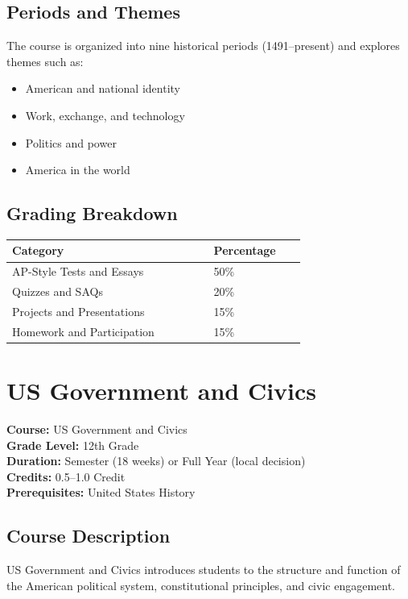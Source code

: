 \documentclass[12pt,oneside]{book}
\begin{document}
\section{Periods and Themes}
The course is organized into nine historical periods (1491--present) and explores themes such as:
\begin{itemize}[leftmargin=2em]
    \item American and national identity
    \item Work, exchange, and technology
    \item Politics and power
    \item America in the world
\end{itemize}

\section{Grading Breakdown}
\begin{center}
\begin{tabular}{L{0.55\linewidth}L{0.25\linewidth}}
\toprule
\textbf{Category} & \textbf{Percentage} \\
\midrule
AP-Style Tests and Essays & 50\% \\
Quizzes and SAQs & 20\% \\
Projects and Presentations & 15\% \\
Homework and Participation & 15\% \\
\bottomrule
\end{tabular}
\end{center}

\chapter{US Government and Civics}

\noindent\textbf{Course:} US Government and Civics\\
\textbf{Grade Level:} 12th Grade\\
\textbf{Duration:} Semester (18 weeks) or Full Year (local decision)\\
\textbf{Credits:} 0.5--1.0 Credit\\
\textbf{Prerequisites:} United States History

\section{Course Description}
US Government and Civics introduces students to the structure and function of the American
political system, constitutional principles, and civic engagement.
\end{document}
